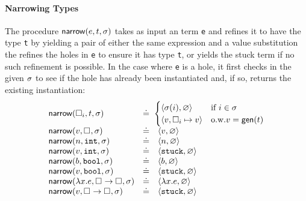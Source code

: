 \paragraph{Narrowing Types} The procedure $\mathsf{narrow}(e, t, \sigma)$ takes as
input an term \texttt{e} and refines it to have the type \texttt{t} by
yielding a pair of either the same expression and a value substitution
the refines the holes in \texttt{e} to ensure it has type \texttt{t}, or
yields the stuck term if no such refinement is possible. In the case
where \texttt{e} is a hole, it first checks in the given $\sigma$ to see
if the hole has already been instantiated and, if so, returns the
existing instantiation:
%
$$
\begin{array}{lcl}
\mathsf{narrow}(\square_{i}, t, \sigma) & \doteq & \hspace{-1ex}
\begin{cases}
  \langle \sigma(i), \varnothing \rangle        & \mbox{if}\ i \in \sigma \\
  \langle v, \square_{i} \mapsto v \rangle   & \mbox{o.w.} v = \mathsf{gen}(t)\\
\end{cases} \\
\mathsf{narrow}(v, \square_{}, \sigma)  & \doteq & \langle v, \varnothing \rangle \\
\mathsf{narrow}(n, \mathtt{int}, \sigma)     & \doteq & \langle n, \varnothing \rangle \\
\mathsf{narrow}(v, \mathtt{int}, \sigma)     & \doteq & \langle \mathtt{stuck}, \varnothing \rangle \\
\mathsf{narrow}(b, \mathtt{bool}, \sigma)    & \doteq & \langle b, \varnothing \rangle \\
\mathsf{narrow}(v, \mathtt{bool}, \sigma)    & \doteq & \langle \mathtt{stuck}, \varnothing \rangle \\
\mathsf{narrow}(\lambda x. e, {\square_{}} \rightarrow \square_{}, \sigma) & \doteq & \langle \lambda x. e, \varnothing \rangle \\
\mathsf{narrow}(v, {\square_{}} \rightarrow \square_{}, \sigma) & \doteq & \langle \mathtt{stuck}, \varnothing \rangle \\
\end{array}
$$

